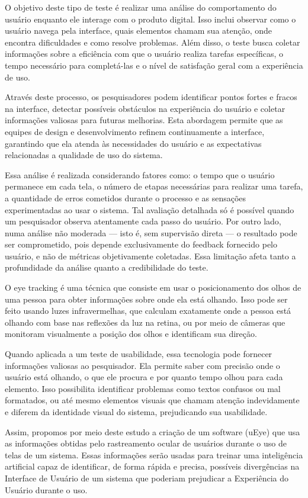 O objetivo deste tipo de teste é realizar uma análise do comportamento do usuário enquanto ele interage com o produto digital. Isso inclui observar como o usuário navega pela interface, quais elementos chamam sua atenção, onde encontra dificuldades e como resolve problemas. Além disso, o teste busca coletar informações sobre a eficiência com que o usuário realiza tarefas específicas, o tempo necessário para completá-las e o nível de satisfação geral com a experiência de uso.

Através deste processo, os pesquisadores podem identificar pontos fortes e fracos na interface, detectar possíveis obstáculos na experiência do usuário e coletar informações valiosas para futuras melhorias. Esta abordagem permite que as equipes de design e desenvolvimento refinem continuamente a interface, garantindo que ela atenda às necessidades do usuário e as expectativas relacionadas a qualidade de uso do sistema.

Essa análise é realizada considerando fatores como: o tempo que o usuário permanece em cada tela, o número de etapas necessárias para realizar uma tarefa, a quantidade de erros cometidos durante o processo e as sensações experimentadas ao usar o sistema. Tal avaliação detalhada só é possível quando um pesquisador observa atentamente cada passo do usuário. Por outro lado, numa análise não moderada — isto é, sem supervisão direta — o resultado pode ser comprometido, pois depende exclusivamente do feedback fornecido pelo usuário, e não de métricas objetivamente coletadas. Essa limitação afeta tanto a profundidade da análise quanto a credibilidade do teste.

\textcite{BELISIARIO2023, VIEIRA2019}


O eye tracking é uma técnica que consiste em usar o posicionamento dos olhos de uma pessoa para obter informações sobre onde ela está olhando. Isso pode ser feito usando luzes infravermelhas, que calculam exatamente onde a pessoa está olhando com base nas reflexões da luz na retina, ou por meio de câmeras que monitoram visualmente a posição dos olhos e identificam sua direção.

Quando aplicada a um teste de usabilidade, essa tecnologia pode fornecer informações valiosas ao pesquisador. Ela permite saber com precisão onde o usuário está olhando, o que ele procura e por quanto tempo olhou para cada elemento. Isso possibilita identificar problemas como textos confusos ou mal formatados, ou até mesmo elementos visuais que chamam atenção indevidamente e diferem da identidade visual do sistema, prejudicando sua usabilidade.

Assim, propomos por meio deste estudo a criação de um software (uEye) que usa as informações obtidas pelo rastreamento ocular de usuários durante o uso de telas de um sistema. Essas informações serão usadas para treinar uma inteligência artificial capaz de identificar, de forma rápida e precisa, possíveis divergências na Interface de Usuário de um sistema que poderiam prejudicar a Experiência do Usuário durante o uso.


